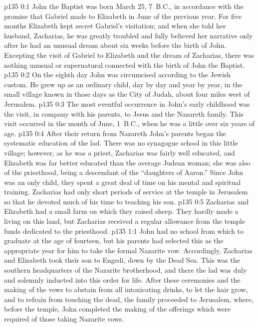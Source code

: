 \author{Midwayer Commission}
\vs p135 0:1 John the Baptist was born March 25, 7~B.C., in accordance with the promise that Gabriel made to Elizabeth in June of the previous year. For five months Elizabeth kept secret Gabriel’s visitation; and when she told her husband, Zacharias, he was greatly troubled and fully believed her narrative only after he had an unusual dream about six weeks before the birth of John. Excepting the visit of Gabriel to Elizabeth and the dream of Zacharias, there was nothing unusual or supernatural connected with the birth of John the Baptist.\plusone
\vs p135 0:2 On the eighth day John was circumcised according to the Jewish custom. He grew up as an ordinary child, day by day and year by year, in the small village known in those days as the City of Judah, about four miles west of Jerusalem.
\vs p135 0:3 The most eventful occurrence in John’s early childhood was the visit, in company with his parents, to Jesus and the Nazareth family. This visit occurred in the month of June, 1~B.C., when he was a little over six years of age.
\vs p135 0:4 After their return from Nazareth John’s parents began the systematic education of the lad. There was no synagogue school in this little village; however, as he was a priest, Zacharias was fairly well educated, and Elizabeth was far better educated than the average Judean woman; she was also of the priesthood, being a descendant of the “daughters of Aaron.” Since John was an only child, they spent a great deal of time on his mental and spiritual training. Zacharias had only short periods of service at the temple in Jerusalem so that he devoted much of his time to teaching his son.
\vs p135 0:5 Zacharias and Elizabeth had a small farm on which they raised sheep. They hardly made a living on this land, but Zacharias received a regular allowance from the temple funds dedicated to the priesthood.
\vs p135 1:1 John had no school from which to graduate at the age of fourteen, but his parents had selected this as the appropriate year for him to take the formal Nazarite vow. Accordingly, Zacharias and Elizabeth took their son to Engedi, down by the Dead Sea. This was the southern headquarters of the Nazarite brotherhood, and there the lad was duly and solemnly inducted into this order for life. After these ceremonies and the making of the vows to abstain from all intoxicating drinks, to let the hair grow, and to refrain from touching the dead, the family proceeded to Jerusalem, where, before the temple, John completed the making of the offerings which were required of those taking Nazarite vows.
